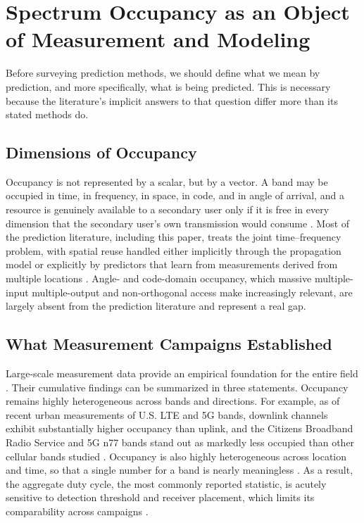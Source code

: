\documentclass[lettersize,journal]{IEEEtran}
\begin{document}
\section{\textbf{Spectrum Occupancy as an Object of Measurement and Modeling}}

Before surveying prediction methods, we should define what
we mean by prediction, and more specifically, what is being predicted.
This is necessary because the literature's implicit answers to that
question differ more than its stated methods do.

\subsection{\textbf{Dimensions of Occupancy}}
Occupancy is not represented by a scalar, but by a vector.
A band may be occupied in time, in frequency,
in space, in code, and in angle of arrival, and a resource is genuinely
available to a secondary user only if it is free in every dimension that
the secondary user's own transmission would consume \cite{Yucek2009}.
Most of the prediction literature, including this paper, treats the joint
time--frequency problem, with spatial reuse handled either implicitly
through the propagation model or explicitly by predictors that learn from
measurements derived from multiple locations \cite{Li2021, Ren2021, Shawel2019}.
Angle- and code-domain occupancy, which massive multiple-input
multiple-output and non-orthogonal access make increasingly relevant,
are largely absent from the prediction literature and represent a real
gap.

\subsection{\textbf{What Measurement Campaigns Established}}
Large-scale measurement data provide an empirical foundation for the
entire field \cite{Chen2016}.
Their cumulative findings can be summarized in three statements.
Occupancy remains highly heterogeneous across bands and directions.
For example, as of recent urban measurements of U.S. LTE and 5G
bands, downlink channels exhibit substantially higher occupancy than
uplink, and the Citizens Broadband Radio Service and 5G n77 bands stand
out as markedly less occupied than other cellular bands studied
\cite{Raouf2023}.
Occupancy is also highly heterogeneous across location and
time, so that a single number for a band is nearly meaningless
\cite{Wellens2007, Engiz2021, Kozlowski2021}.
As a result, the aggregate duty cycle, the most commonly reported statistic,
is acutely sensitive to detection threshold and receiver placement, which limits
its comparability across campaigns \cite{Wellens2010}.
\end{document}

